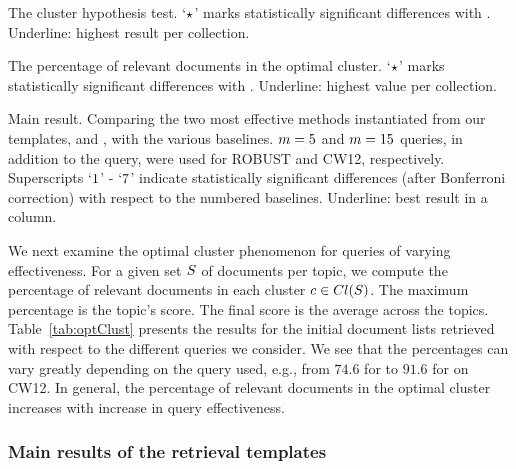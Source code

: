 \begin{table}[t]
\caption{\label{tab:clustHypo}The cluster hypothesis test. `$\star$' marks statistically significant differences with \qOneAP. Underline: highest result per collection.}

\end{table}

\begin{table}[t]
\caption{\label{tab:optClust}The percentage of relevant documents in the optimal cluster. `$\star$' marks statistically significant differences with \maxAP. Underline: highest value per collection.}

\end{table}
\begin{table}[t]
\caption{\label{tab:main} Main result. Comparing the two most effective methods instantiated from our templates, \inst{\clustMRF}{\clustFuse} and \inst{\interp}{\queryCat}, with the various baselines. $m=5$ and $m=15$ queries, in addition to the \titleQuery query, were used for ROBUST and CW12, respectively. Superscripts `$1$' - `$7$' indicate statistically significant differences (after Bonferroni correction) with respect to the numbered baselines. Underline: best result in a column.}

\end{table}

We next examine the optimal cluster phenomenon for queries of varying effectiveness. For a given set $S$ of documents per topic, we compute the percentage of relevant documents in each cluster $c \in Cl(S)$. The maximum percentage is the topic's score. The final score is the average across the topics. Table~\ref{tab:optClust} presents the results for the initial document lists retrieved with respect to the different queries we consider.
We see that the percentages can vary greatly depending on the query used, e.g., from $74.6$ for \qOneAP to $91.6$ for \maxAP on CW12.  In general, the percentage of relevant documents in the optimal cluster increases with increase in query effectiveness. 


\subsubsection{Main results of the retrieval templates}




